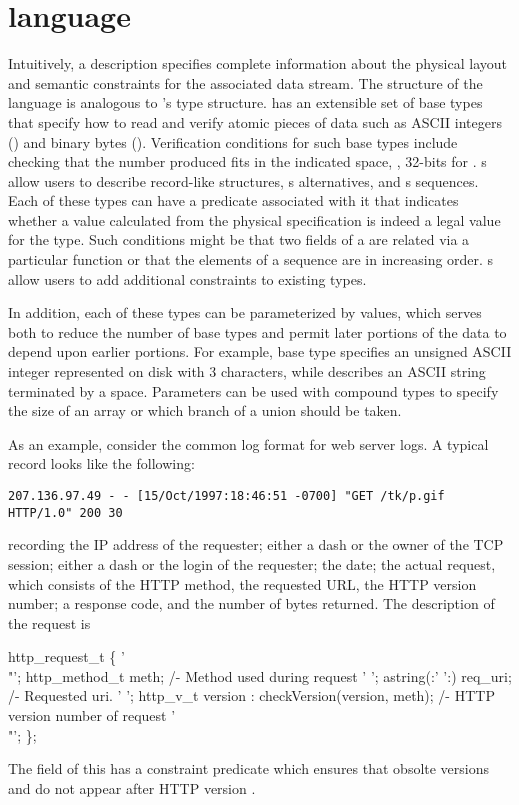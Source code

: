 \documentclass[10pt]{article}
\begin{document}
\section{\pads{} language}
Intuitively, a \pads{} description specifies complete information
about the physical layout and semantic constraints for the associated
data stream.  The structure of the language is analogous to \C{}'s
type structure.  \pads{} has an extensible set of base types that
specify how to read and verify atomic pieces of data such as ASCII
integers () and binary bytes ().
Verification conditions for such base types include checking that the
number produced fits in the indicated space, \ie, 32-bits for
.  \pads{}
s allow users to describe record-like structures, 
s alternatives, and s sequences.  Each of these
types can have a predicate associated with it that indicates whether a
value calculated from the physical specification is indeed a legal
value for the type.  Such conditions might be that two fields of a
 are related via a particular function or that the elements
of a sequence are in increasing order.  \pads{} s allow
users to add additional constraints to existing types. 

In addition, each of these types can be parameterized by values, which
serves both to reduce the number of base types and permit later
portions of the data to depend upon earlier portions.  For example,
base type  specifies an unsigned ASCII integer
represented on disk with 3 characters, while 
describes an ASCII string terminated by a space.  Parameters can be 
used with compound types to specify the size of an array or which
branch of a union should be taken.

As an example, consider the common log format for web server logs.  A
typical record looks like the following:
\begin{verbatim}
207.136.97.49 - - [15/Oct/1997:18:46:51 -0700] "GET /tk/p.gif HTTP/1.0" 200 30
\end{verbatim}
recording the IP address of the requester; either a dash or the owner
of the TCP session; either a dash or the login of the requester; the
date; the actual request, which consists of the HTTP method, the
requested URL, the HTTP version number; a response code, and the
number of bytes returned.  The \pads{} description of the request is 
\begin{code}
 http_request_t \{
  '\\"'; http_method_t  meth;            /- Method used during request
  ' ';  astring(:' ':) req_uri;         /- Requested uri.
  ' ';  http_v_t       version : checkVersion(version, meth);
                                        /- HTTP version number of request 
  '\\"';
\};
\end{code}
The  field of this  has a constraint predicate
which ensures that obsolte versions  and  do not
appear after HTTP version .
\end{document}
